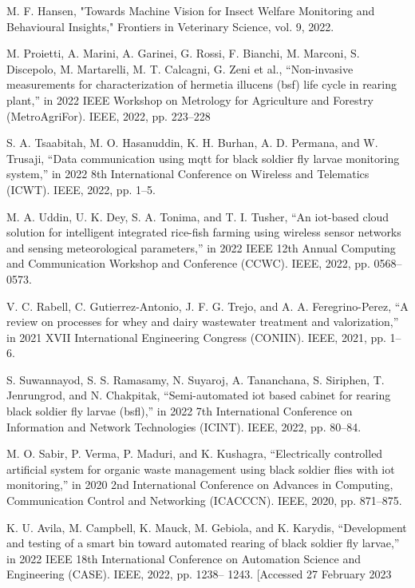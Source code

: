 \documentclass[conference]{IEEEtran}
\begin{document}
\begin{thebibliography}{99}
M. F. Hansen, "Towards Machine Vision for Insect Welfare Monitoring and Behavioural Insights," Frontiers in Veterinary 
Science, vol. 9, 2022.

M. Proietti, A. Marini, A. Garinei, G. Rossi, F. Bianchi, M. Marconi,
S. Discepolo, M. Martarelli, M. T. Calcagni, G. Zeni et al., “Non-invasive
measurements for characterization of hermetia illucens (bsf) life cycle in
rearing plant,” in 2022 IEEE Workshop on Metrology for Agriculture and
Forestry (MetroAgriFor). IEEE, 2022, pp. 223–228

 S. A. Tsaabitah, M. O. Hasanuddin, K. H. Burhan, A. D. Permana, and
W. Trusaji, “Data communication using mqtt for black soldier fly larvae
monitoring system,” in 2022 8th International Conference on Wireless
and Telematics (ICWT). IEEE, 2022, pp. 1–5.

 M. A. Uddin, U. K. Dey, S. A. Tonima, and T. I. Tusher, “An iot-based
cloud solution for intelligent integrated rice-fish farming using wireless
sensor networks and sensing meteorological parameters,” in 2022 IEEE
12th Annual Computing and Communication Workshop and Conference
(CCWC). IEEE, 2022, pp. 0568–0573.

 V. C. Rabell, C. Gutierrez-Antonio, J. F. G. Trejo, and A. A. Feregrino-Perez, “A review on processes for whey and dairy wastewater treatment and valorization,” in 2021 XVII International Engineering Congress
(CONIIN). IEEE, 2021, pp. 1–6.

 S. Suwannayod, S. S. Ramasamy, N. Suyaroj, A. Tananchana, S. Siriphen,
T. Jenrungrod, and N. Chakpitak, “Semi-automated iot based cabinet
for rearing black soldier fly larvae (bsfl),” in 2022 7th International
Conference on Information and Network Technologies (ICINT). IEEE,
2022, pp. 80–84.

 M. O. Sabir, P. Verma, P. Maduri, and K. Kushagra, “Electrically
controlled artificial system for organic waste management using black
soldier flies with iot monitoring,” in 2020 2nd International Conference
on Advances in Computing, Communication Control and Networking
(ICACCCN). IEEE, 2020, pp. 871–875.

 K. U. Avila, M. Campbell, K. Mauck, M. Gebiola, and K. Karydis,
“Development and testing of a smart bin toward automated rearing of
black soldier fly larvae,” in 2022 IEEE 18th International Conference on
Automation Science and Engineering (CASE). IEEE, 2022, pp. 1238–
1243.
[Accessed 27 February 2023

\end{thebibliography}
\end{document}
